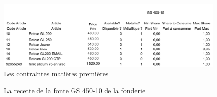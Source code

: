 \documentclass[12pt]{article}
\begin{document}
\begin{figure}[H]
    \centering
    \begin{adjustbox}{width=1.25\textwidth,center}
        \includegraphics[scale=1]{Images/Recette/Contraintes matières premières 1.pdf}
    \end{adjustbox}
    \caption{Les contraintes matières premières}
    \label{fig:contraintes3}
\end{figure}







\begin{figure}[H]
    \centering
    \caption{La recette de la fonte GS 450-10 de la fonderie}
    \label{fig:Recette1}
\end{figure}
\end{document}

